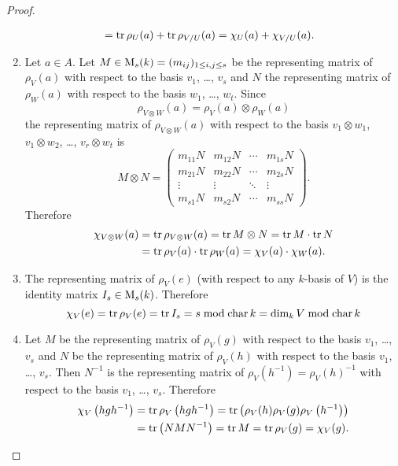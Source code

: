 \begin{proof}
\begin{enumerate}[label=\emph{\alph*)},leftmargin=*]
\begin{align*}
        &= \operatorname{tr} \rho_U(a) + \operatorname{tr} \rho_{V/U}(a)
        = \chi_U(a) + \chi_{V/U}(a).
      \end{align*}
    \item
      Let $a \in A$. Let $M \in \operatorname{M}_s(k) = (m_{ij})_{1 \leq i,j \leq s}$ be the representing matrix of $\rho_V(a)$ with respect to the basis $v_1$, \dots, $v_s$ and $N$ the representing matrix of $\rho_W(a)$ with respect to the basis $w_1$, \dots, $w_t$. Since
      \[
        \rho_{V \otimes W}(a) = \rho_V(a) \otimes \rho_W(a)
      \]
      the representing matrix of $\rho_{V \otimes W}(a)$ with respect to the basis $v_1 \otimes w_1$, $v_1 \otimes w_2$, \dots, $v_r \otimes w_t$ is
      \[
        M \otimes N =
        \begin{pmatrix}
          m_{11} N & m_{12} N & \cdots & m_{1s} N \\
          m_{21} N & m_{22} N & \cdots & m_{2s} N \\
          \vdots   & \vdots   & \ddots & \vdots   \\
          m_{s1} N & m_{s2} N & \cdots & m_{ss} N
        \end{pmatrix}.
      \]
      Therefore
      \begin{align*}
        \chi_{V \otimes W}(a)
        &= \operatorname{tr} \rho_{V \otimes W}(a)
        = \operatorname{tr} M \otimes N
        = \operatorname{tr} M \cdot \operatorname{tr} N \\
        &= \operatorname{tr} \rho_V(a) \cdot \operatorname{tr} \rho_W(a)
        = \chi_V(a) \cdot \chi_W(a).
      \end{align*}
    \item
      The representing matrix of $\rho_V(e)$ (with respect to any $k$-basis of $V$) is the identity matrix $I_s \in \operatorname{M}_s(k)$. Therefore
      \[
        \chi_V(e) = \operatorname{tr} \rho_V(e) = \operatorname{tr} I_s = s \bmod \operatorname{char} k = \dim_k V \bmod \operatorname{char} k
      \]
    \item
      Let $M$ be the representing matrix of $\rho_V(g)$ with respect to the basis $v_1$, \dots, $v_s$ and $N$ be the representing matrix of $\rho_V(h)$ with respect to the basis $v_1$, \dots, $v_s$. Then $N^{-1}$ is the representing matrix of $\rho_V(h^{-1}) = \rho_V(h)^{-1}$ with respect to the basis $v_1$, \dots, $v_s$. Therefore
      \begin{align*}
        \chi_V\left( hgh^{-1} \right)
        &= \operatorname{tr} \rho_V\left( hgh^{-1} \right)
        = \operatorname{tr}\left( \rho_V(h) \rho_V(g) \rho_V\left( h^{-1} \right) \right) \\
        &= \operatorname{tr}\left( NMN^{-1} \right)
        = \operatorname{tr} M
        = \operatorname{tr} \rho_V(g)
        = \chi_V(g).
      \end{align*}

\end{enumerate}
\end{proof}
